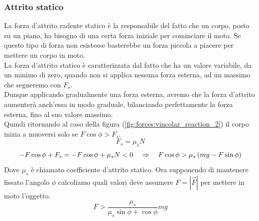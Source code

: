 \subsubsection{Attrito statico}
La forza d'attrito radente statico è la responsabile del fatto che un corpo,
posto su un piano, ha bisogno di una certa forza iniziale per cominciare il
moto. Se questo tipo di forza non esistesse basterebbe un forza piccola a
piacere per mettere un corpo in moto.\\
La forza d'attrito statico è caratterizzata dal fatto che ha un valore
variabile, da un minimo di zero, quando non si applica nessuna forza esterna,
ad un massimo che segneremo con $F_s$.
\\Dunque applicando gradualmente una forza esterna, avremo che la forza
d'attrito aumenterà anch'essa in modo graduale, bilanciando perfettamente
la forza esterna, fino al suo valore massimo.\\
Quindi ritornando al caso della figura (\ref{fig:forces:vincolar_reaction_2})
il corpo inizia a muoversi solo se $F\cos\phi > F_s$. 
\begin{equation}
    F_s = \mu_sN
\label{eq:forces:static}
\end{equation}
\begin{equation}
    -F\cos\phi + F_s = -F\cos\phi + \mu_s N < 0\quad\Rightarrow\quad F\cos\phi >
    \mu_s\left( mg - F\sin\phi\right)
\end{equation}
Dove $\mu_s$ è chiamato coefficiente d'attrito statico.
Ora supponendo di mantenere fissato l'angolo $\phi$ calcoliamo quali
valori deve assumere $F = \left|\vec F\right|$ per mettere in moto l'oggetto.
\begin{equation}
    F > \frac{\mu_s}{\mu_s\sin\phi+\cos\phi}mg
\end{equation}
